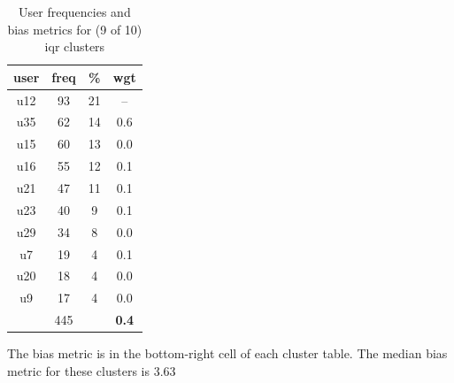 \begin{table}
\begin{tabular}{ |c|c|c|c| }
	\hline
	\textbf{user} & \textbf{freq} & \textbf{\%} & \textbf{wgt} \\
	\hline
	u12 & 93 & 21 & -- \\
	u35 & 62 & 14 & 0.6 \\
	u15 & 60 & 13 & 0.0 \\
	u16 & 55 & 12 & 0.1 \\
	u21 & 47 & 11 & 0.1 \\
	u23 & 40 & 9 & 0.1 \\
	u29 & 34 & 8 & 0.0 \\
	u7 & 19 & 4 & 0.1 \\
	u20 & 18 & 4 & 0.0 \\
	u9 & 17 & 4 & 0.0 \\
	 & 445 & & \textbf{0.4} \\
	\hline
\end{tabular}
\caption{User frequencies and bias metrics for (9 of 10) iqr clusters}
{\small The bias metric is in the bottom-right cell of each cluster table. The median bias metric for these clusters is 3.63}
\end{table}

